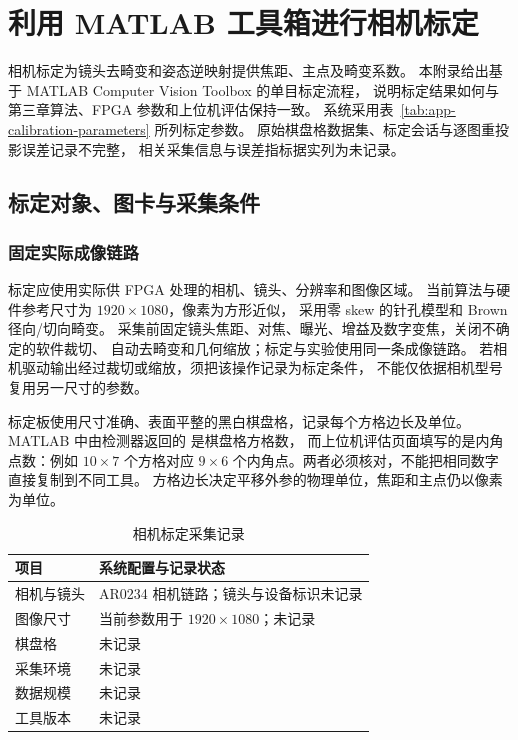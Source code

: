 \chapter{利用 MATLAB 工具箱进行相机标定}
\label{app:camera-calibration}

相机标定为镜头去畸变和姿态逆映射提供焦距、主点及畸变系数。
本附录给出基于 MATLAB Computer Vision Toolbox 的单目标定流程，
说明标定结果如何与第三章算法、FPGA 参数和上位机评估保持一致。
系统采用表~\ref{tab:app-calibration-parameters} 所列标定参数。
原始棋盘格数据集、标定会话与逐图重投影误差记录不完整，
相关采集信息与误差指标据实列为未记录。

\section{标定对象、图卡与采集条件}
\subsection{固定实际成像链路}
标定应使用实际供 FPGA 处理的相机、镜头、分辨率和图像区域。
当前算法与硬件参考尺寸为 $1920\times1080$，像素为方形近似，
采用零 skew 的针孔模型和 Brown 径向/切向畸变。
采集前固定镜头焦距、对焦、曝光、增益及数字变焦，关闭不确定的软件裁切、
自动去畸变和几何缩放；标定与实验使用同一条成像链路。
若相机驱动输出经过裁切或缩放，须把该操作记录为标定条件，
不能仅依据相机型号复用另一尺寸的参数。

标定板使用尺寸准确、表面平整的黑白棋盘格，记录每个方格边长及单位。
MATLAB 中由检测器返回的  是棋盘格方格数，
而上位机评估页面填写的是内角点数：例如 $10\times7$ 个方格对应
$9\times6$ 个内角点。两者必须核对，不能把相同数字直接复制到不同工具。
方格边长决定平移外参的物理单位，焦距和主点仍以像素为单位。

\begin{table}[htbp]\centering\small
\caption{相机标定采集记录}\label{tab:app-calibration-capture}
\begin{tabularx}{\textwidth}{>{\raggedright\arraybackslash}p{3.5cm}Y}
\toprule
项目 & 系统配置与记录状态 \\
\midrule
相机与镜头 & AR0234 相机链路；镜头与设备标识未记录 \\
图像尺寸 & 当前参数用于 $1920\times1080$；未记录 \\
棋盘格 & 未记录 \\
采集环境 & 未记录 \\
数据规模 & 未记录 \\
工具版本 & 未记录 \\
\bottomrule
\end{tabularx}
\end{table}

